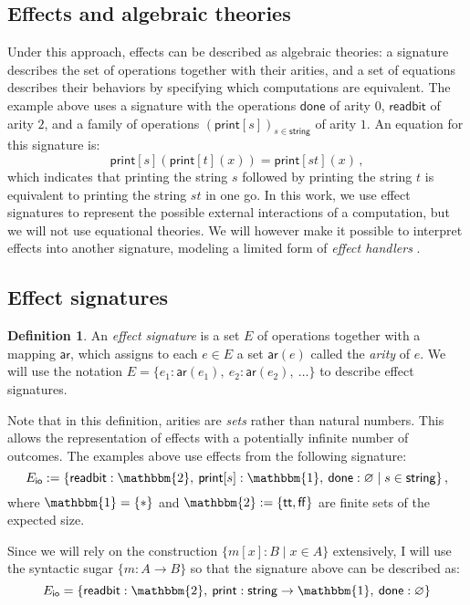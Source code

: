 \documentclass[draft,11pt]{report}
\theoremstyle{definition}
\newtheorem{definition}[theorem]{Definition}
\newcommand{\kw}[1]{\ensuremath{ \mathsf{#1} }}
\begin{document}

\subsection{Effects and algebraic theories} %

Under this approach,
effects can be described as algebraic theories:
a signature describes the set of operations together with their arities,
and a set of equations describes their behaviors
by specifying which computations are equivalent.
The example above uses a signature with the operations
$\kw{done}$ of arity $0$,
$\kw{readbit}$ of arity $2$,
and a family of operations $(\kw{print}[s])_{s \in \kw{string}}$
of arity $1$.
An equation for this signature is:
\[
    \kw{print}[s](\kw{print}[t](x)) =
    \kw{print}[st](x) \,,
\]
which indicates that
printing the string $s$ followed by
printing the string $t$ is equivalent to
printing the string $st$ in one go.
In this work,
we use effect signatures to represent
the possible external interactions
of a computation,
but we will not use equational theories.
We will however make it possible to interpret effects
into another signature,
modeling a limited form of
\emph{effect handlers} \citep{eff}.


\subsection{Effect signatures} %

\begin{definition} \label{def:esig}
An \emph{effect signature}
is a set $E$ of operations
together with a mapping $\kw{ar}$,
which assigns to each $e \in E$ a set $\kw{ar}(e)$
called the \emph{arity} of $e$.
We will use the notation
$E = \{ e_1 : \kw{ar}(e_1), \: e_2 : \kw{ar}(e_2), \: \ldots \}$
to describe effect signatures.
\end{definition}

Note that in this definition,
arities are \emph{sets} rather than natural numbers.
This allows the representation of effects
with a potentially infinite number of outcomes.
The examples above
use effects from the following signature:
\[
  E_\kw{io} :=
  \{ \kw{readbit} : \mathbbm{2}, \:
     \kw{print}[s] : \mathbbm{1}, \:
     \kw{done} : \varnothing \mid
     s \in \kw{string} \}
  \,,
\]
where $\mathbbm{1} = \{ * \}$ and $\mathbbm{2} := \{ \kw{tt}, \kw{ff} \}$
are finite sets of the expected size.

Since we will rely on the construction
$\{ m[x] : B \mid x \in A \}$
extensively,
I will use the syntactic sugar
$\{ m : A \rightarrow B \}$
so that the signature above can be described as:
\[
  E_\kw{io} =
  \{ \kw{readbit} : \mathbbm{2}, \:
     \kw{print} : \kw{string} \rightarrow \mathbbm{1}, \:
     \kw{done} : \varnothing \}
\]
\end{document}
